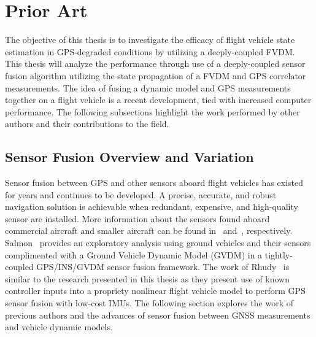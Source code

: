 \section{\textbf{Prior Art}}
The objective of this thesis is to investigate the efficacy of flight vehicle state estimation in GPS-degraded conditions by utilizing a deeply-coupled FVDM\@. This thesis will analyze the performance through use of a deeply-coupled sensor fusion algorithm utilizing the state propagation of a FVDM and GPS correlator measurements. The idea of fusing a dynamic model and GPS measurements together on a flight vehicle is a recent development, tied with increased computer performance. The following subsections highlight the work performed by other authors and their contributions to the field.
\subsection{\textbf{Sensor Fusion Overview and Variation}}
Sensor fusion between GPS and other sensors aboard flight vehicles has existed for years and continues to be developed. A precise, accurate, and robust navigation solution is achievable when redundant, expensive, and high-quality sensor are installed. More information about the sensors found aboard commercial aircraft and smaller aircraft can be found in~\cite{airbuscustomerservicesAirbusA380Aircraft2020} and~\cite{DiamondAircraftDA401969}, respectively. Salmon~\cite{salmonExperimentalExplorationLowCost2015} provides an exploratory analysis using ground vehicles and their sensors complimented with a Ground Vehicle Dynamic Model (GVDM) in a tightly-coupled GPS/INS/GVDM sensor fusion framework. The work of Rhudy~\cite{rhudyDynamicModelaidedSensor2017} is similar to the research presented in this thesis as they present use of known controller inputs into a propriety nonlinear flight vehicle model to perform GPS sensor fusion with low-cost IMUs. The following section explores the work of previous authors and the advances of sensor fusion between GNSS measurements and vehicle dynamic models.

